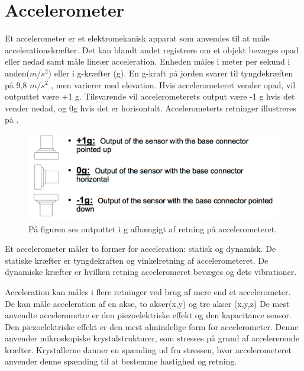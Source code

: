 \section{Accelerometer} 
Et accelerometer er et elektromekanisk apparat som anvendes til at måle accelerationskræfter. Det kan blandt andet registrere om et objekt bevæges opad eller nedad samt måle lineær acceleration\citep{Goodrich2013}. Enheden måles i meter per sekund i anden($m/s^2$) eller i g-kræfter (g). En g-kraft på jorden svarer til tyngdekræften på 9,8 $m/s^2$ , men varierer med elevation. \citep{Sparkfun}
Hvis accelerometeret vender opad, vil outputtet være +1 g. Tilsvarende vil accelerometerets output være -1 g hvis det vender nedad, og 0g hvis det er horisontalt. Accelerometerts retninger illustreres på . \citep{Inspire}

\begin{figure}[H]
	\centering
	\includegraphics[scale=0.25]{figures/bProblemloesning/g.png}
	\caption{På figuren ses outputtet i g afhængigt af retning på accelerometeret. \citep{Inspire}}
	\label{fig:g}
\end{figure}

Et accelerometer måler to former for acceleration: statisk og dynamisk. De statiske kræfter er tyngdekraften og  vinkelretning af accelerometeret. De dynamiske kræfter er hvilken retning acceleromeret bevæges og dets vibrationer. \citep{Sparkfun,Engineering, Goodrich2013}

 

 Acceleration kan måles i flere retninger ved brug af mere end et accelerometer. De kan måle acceleration af en akse, to akser(x,y) og tre akser (x,y,z)  \citep{Sparkfun} %
De mest anvendte accelerometre er den piezoelektriske effekt og den kapacitance sensor. 
Den piezoelektriske effekt er den mest almindelige form for accelerometer. Denne anvender mikroskopiske krystalstrukturer, som stresses på grund af accelererende kræfter. Krystallerne danner en spænding ud fra stressen, hvor accelerometeret anvender denne spænding til at bestemme hastighed og retning. \citep{Goodrich2013}

